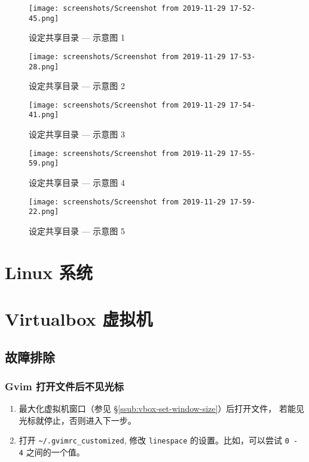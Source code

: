 \documentclass[
    11pt,
    cite=authoryear,
    device=normal,
    lang=cn,
    mode=simple,
    result=answer,
    toc=onecol,
]{elegantbook_sierxue}
\begin{document}
\begin{figure}[!htbp]
  \centering
  \texttt{[image: screenshots/Screenshot from
  2019-11-29 17-52-45.png]}
  \caption{设定共享目录 --- 示意图 1}
\end{figure}
\begin{figure}[!htbp]
  \centering
  \texttt{[image: screenshots/Screenshot from
  2019-11-29 17-53-28.png]}
  \caption{设定共享目录 --- 示意图 2}
\end{figure}
\begin{figure}[!htbp]
  \centering
  \texttt{[image: screenshots/Screenshot from
  2019-11-29 17-54-41.png]}
  \caption{设定共享目录 --- 示意图 3}
\end{figure}
\begin{figure}[!htbp]
  \centering
  \texttt{[image: screenshots/Screenshot from
  2019-11-29 17-55-59.png]}
  \caption{设定共享目录 --- 示意图 4}
\end{figure}
\begin{figure}[!htbp]
  \centering
  \texttt{[image: screenshots/Screenshot from
  2019-11-29 17-59-22.png]}
  \caption{设定共享目录 --- 示意图 5}
\end{figure}

\section{Linux 系统}%
\label{sec:linux-a}

\section{Virtualbox 虚拟机}%
\label{sec:vbox-a}

\subsection{故障排除}%
\label{sub:vim-troubleshooting}

\subsubsection{Gvim 打开文件后不见光标}%
\label{ssub:vim-ts-cursor}

\begin{enumerate}
    \item 最大化虚拟机窗口（参见
        \S\ref{ssub:vbox-set-window-size}）后打开文件，
        若能见光标就停止，否则进入下一步。
    \item 打开 \lstinline{~/.gvimrc_customized}, 修改
        \lstinline{linespace} 的设置。比如，可以尝试  \lstinline{0 - 4}
        之间的一个值。
\end{enumerate}
\end{document}
